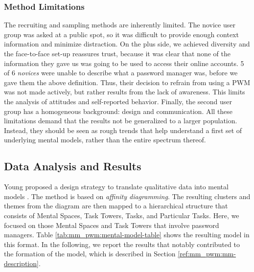 \subsubsection{Method Limitations}
The recruiting and sampling methods are inherently limited. The novice user group was asked at a public spot, so it was difficult to provide enough context information and minimize distraction. On the plus side, we achieved diversity and the face-to-face set-up reassures trust, because it was clear that none of the information they gave us was going to be used to access their online accounts. 5 of 6 \textit{novices} were unable to describe what a password manager was, before we gave them the above definition. Thus, their decision to refrain from using a \gls{PWM} was not made actively, but rather results from the lack of awareness. This limits the analysis of attitudes and self-reported behavior. Finally, the second user group has a homogeneous background: design and communication. All these limitations demand that the results not be generalized to a larger population. Instead, they should be seen as rough trends that help understand a first set of underlying mental models, rather than the entire spectrum thereof.

\subsection{Data Analysis and Results}
Young proposed a design strategy to translate qualitative data into mental models \cite{Young2008}. The method is based on \textit{affinity diagramming}. The resulting clusters and themes from the diagram are then mapped to a hierarchical structure that consists of Mental Spaces, Task Towers, Tasks, and Particular Tasks. Here, we focused on those Mental Spaces and Task Towers that involve password managers. Table \ref{tab:mm_pwm:mental-model-table} shows the resulting model in this format. In the following, we report the results that notably contributed to the formation of the model, which is described in Section \ref{ref:mm_pwm:mm-description}.



